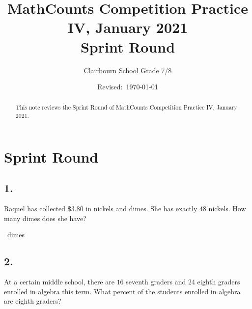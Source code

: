 \documentclass[12pt]{article}
\title{MathCounts Competition Practice IV, January 2021 \\ Sprint Round}
\author{Clairbourn School Grade 7/8}
\date{Revised:~\today}
\begin{document}
\maketitle
\begin{minipage}{\textwidth}
\maketitle
\begin{abstract}
This note reviews the Sprint Round of MathCounts Competition Practice IV, January 2021.
\end{abstract}
\end{minipage}

\newpage
\section*{Sprint Round}


\subsection*{1.}
Raquel has collected $\$3.80$ in nickels and dimes. She has exactly $48$ nickels. How many dimes does she have?

\fbox{\phantom{ANSWER}}~dimes

\begin{answer}
%
\end{answer}


\subsection*{2.}
At a certain middle school, there are $16$ seventh graders and $24$ eighth graders enrolled in algebra this term. What percent of the students enrolled in algebra are eighth graders?
\end{document}
